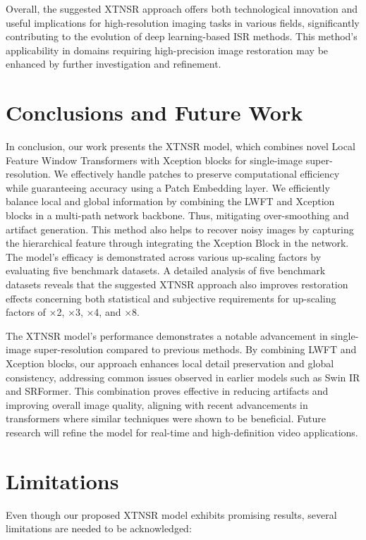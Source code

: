 \documentclass[twocolumn]{svjour3}          %
\begin{document}
Overall, the suggested XTNSR approach offers both technological innovation and useful implications for high-resolution imaging tasks in various fields, significantly contributing to the evolution of deep learning-based ISR methods. This method's applicability in domains requiring high-precision image restoration may be enhanced by further investigation and refinement.

\section{Conclusions and Future Work}

In conclusion, our work presents the XTNSR model, which combines novel Local Feature Window Transformers with Xception blocks for single-image super-resolution. We effectively handle patches to preserve computational efficiency while guaranteeing accuracy using a Patch Embedding layer. We efficiently balance local and global information by combining the LWFT and Xception blocks in a multi-path network backbone. Thus, mitigating over-smoothing and artifact generation. This method also helps to recover noisy images by capturing the hierarchical feature through integrating the Xception Block in the network. The model's efficacy is demonstrated across various up-scaling factors by evaluating five benchmark datasets. A detailed analysis of five benchmark datasets reveals that the suggested XTNSR approach also improves restoration effects concerning both statistical and subjective requirements for up-scaling factors of ×2, ×3, ×4, and ×8. 

The XTNSR model's performance demonstrates a notable advancement in single-image super-resolution compared to previous methods. By combining LWFT and Xception blocks, our approach enhances local detail preservation and global consistency, addressing common issues observed in earlier models such as Swin IR and SRFormer. This combination proves effective in reducing artifacts and improving overall image quality, aligning with recent advancements in transformers where similar techniques were shown to be beneficial. Future research will refine the model for real-time and high-definition video applications.

\section{Limitations}

Even though our proposed XTNSR model exhibits promising results, several limitations are needed to be acknowledged:
\end{document}
